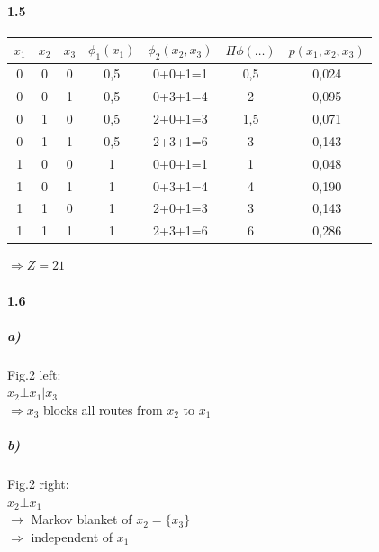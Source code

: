 \documentclass[accentcolor=tud9d,12pt,paper=a4,article]{tudexercise}
\begin{document}
    \paragraph{1.5}
        \begin{table}[h]
            \centering
            \begin{tabular}{c c c|c|c|c|c}
                $x_1$&$x_2$&$x_3$&$\phi_1(x_1)$&$\phi_2(x_2,x_3)$&$\Pi\phi(\dots)$&$p(x_1,x_2,x_3)$ \\\hline
                0 & 0 & 0 & 0,5 & 0+0+1=1 & 0,5 & 0,024 \\
                0 & 0 & 1 & 0,5 & 0+3+1=4 & 2 & 0,095 \\
                0 & 1 & 0 & 0,5 & 2+0+1=3 & 1,5 & 0,071\\
                0 & 1 & 1 & 0,5 & 2+3+1=6 & 3 & 0,143\\
                1 & 0 & 0 & 1 & 0+0+1=1 & 1 & 0,048\\
                1 & 0 & 1 & 1 & 0+3+1=4 & 4 & 0,190\\
                1 & 1 & 0 & 1 & 2+0+1=3 & 3 & 0,143\\
                1 & 1 & 1 & 1 & 2+3+1=6 & 6 & 0,286
            \end{tabular}
        \end{table}
        $\Rightarrow Z=21$
        
    \paragraph{1.6}
    \subparagraph{a)}
        Fig.2 left:\\ $x_2 \bot x_1 | x_3$\\
        $\Rightarrow x_3$ blocks all routes from $x_2$ to $x_1$
        
    \subparagraph{b)}
        Fig.2 right:\\ $x_2 \bot x_1$\\
        $\rightarrow$ Markov blanket of $x_2=\{x_3\}$\\ $\Rightarrow$ independent of $x_1$
    
\end{document}
